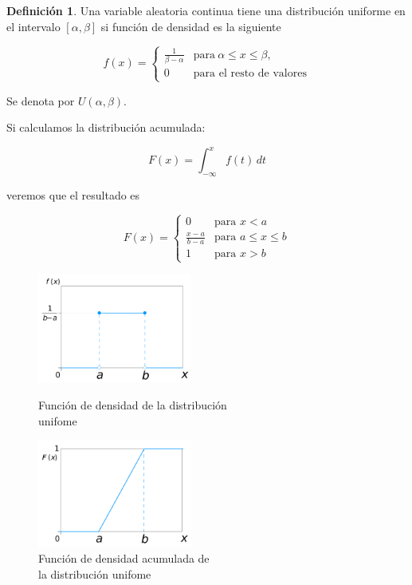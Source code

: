 \documentclass[]{book}
\theoremstyle{plain}
\theoremstyle{definition}
\newtheorem{definition}[theorem]{Definición}
\theoremstyle{definition} %
\begin{document}
\begin{definition}
  
Una variable aleatoria continua tiene una distribución uniforme en el
intervalo \([\alpha, \beta]\) si función de densidad es la siguiente

\[f(x)=\begin{cases}{\frac {1}{\beta-\alpha}}&\mathrm {para} \ \alpha\leq x\leq \beta,\\[8pt]0&\text {para el resto de valores}\end{cases}\]

Se denota por \(U(\alpha, \beta)\).
\end{definition}



Si calculamos la distribución acumulada:

\[F(x)= \int _{-\infty }^{x}f(t)\,dt\]

veremos que el resultado es

\[\displaystyle F(x)=\begin{cases}0&{\text{para }}x<a\\[8pt]{\frac {x-a}{b-a}}&{\text{para }}a\leq x\leq b\\[8pt]1&{\text{para }}x>b\end{cases}\]
 

\begin{figure}[htbp]
  \begin{minipage}{0.5\linewidth}
  \centering
  \includegraphics[width=2in,height=\textheight]{img/uniform.png}
  \caption{Función de densidad de la distribución\\ unifome}
  \end{minipage}%
  \begin{minipage}{0.5\linewidth}
  \centering
  \includegraphics[width=2in,height=\textheight]{img/uniform2.png}
  \caption{Función de densidad acumulada de \\la distribución unifome}
  \end{minipage}

\end{figure} 
\end{document}
